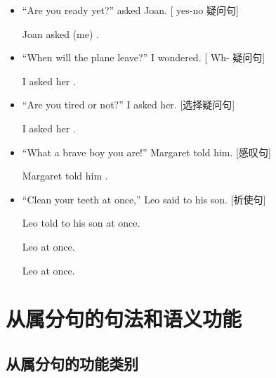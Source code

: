 \begin{itemize}
\item ``Are you ready yet?'' asked Joan. [ yes-no 疑问句]

  Joan asked (me) .

\item ``When will the plane leave?'' I wondered. [ Wh- 疑问句]

 I asked her .
\item ``Are you tired or not?'' I asked her.  [选择疑问句]

  I asked her .

\item ``What a brave boy you are!'' Margaret told him. [感叹句]

  Margaret told him .

\item ``Clean your teeth at once,'' Leo said to his son. [祈使句]

  Leo told to his son  at once.

  Leo  at once.

  Leo  at once.
\end{itemize}

\section{从属分句的句法和语义功能}

\subsection{从属分句的功能类别}

